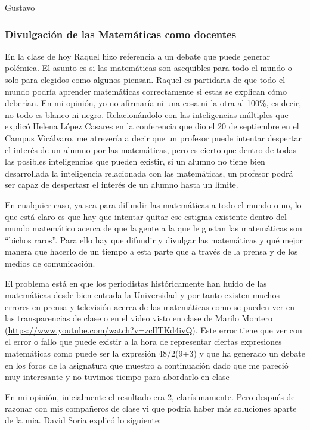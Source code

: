 \begin{opin}{\guscolor}{Gustavo}

\subsubsection{Divulgación de las Matemáticas como docentes}

En la clase de hoy Raquel hizo referencia a un debate que puede generar polémica. El asunto es si las matemáticas son asequibles para todo el mundo o solo para elegidos como algunos piensan. Raquel es partidaria de que todo el mundo podría aprender matemáticas correctamente si estas se explican cómo deberían. En mi opinión, yo no afirmaría ni una cosa ni la otra al 100\%, es decir, no todo es blanco ni negro. Relacionándolo con las inteligencias múltiples que explicó Helena López Casares en la conferencia que dio el 20 de septiembre en el Campus Vicálvaro, me atrevería a decir que un profesor puede intentar despertar el interés de un alumno por las matemáticas, pero es cierto que dentro de todas las posibles inteligencias que pueden existir, si un alumno no tiene bien desarrollada la inteligencia relacionada con las matemáticas, un profesor podrá ser capaz de despertasr el interés de un alumno hasta un límite.

En cualquier caso, ya sea para difundir las matemáticas a todo el mundo o no, lo que está claro es que hay que intentar quitar ese estigma existente dentro del mundo matemático acerca de que la gente a la que le gustan las matemáticas son “bichos raros”. Para ello hay que difundir y divulgar las matemáticas y qué mejor manera que hacerlo de un tiempo a esta parte que a través de la prensa y de los medios de comunicación. 

El problema está en que los periodistas históricamente han huido de las matemáticas desde bien entrada la Universidad y por tanto existen muchos errores en prensa y televisión acerca de las matemáticas como se pueden ver en las transparencias de clase o en el video visto en clase de Marilo Montero (\url{https://www.youtube.com/watch?v=zclITKd4ivQ}). Este error tiene que ver con el error o fallo que puede existir a la hora de representar ciertas expresiones matemáticas como puede ser la expresión 48/2(9+3) y que ha generado un debate en los foros de la asignatura que muestro a continuación dado que  me pareció muy interesante y no tuvimos tiempo para abordarlo en clase

En mi opinión, inicialmente el resultado era 2, clarísimamente. Pero después de razonar con mis compañeros de clase vi que podría haber más soluciones aparte de la mia. David Soria explicó lo siguiente: 


\end{opin}

